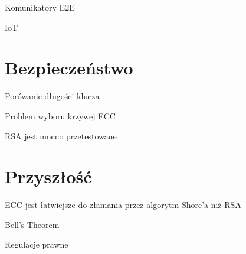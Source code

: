 \documentclass{beamer}
\begin{document}
\begin{frame}{Komunikatory E2E}
    
\end{frame}

\begin{frame}{IoT}
\end{frame}


\section{Bezpieczeństwo}

\begin{frame}{Porówanie długości klucza}
\end{frame}

\begin{frame}{Problem wyboru krzywej ECC}
\end{frame}


\begin{frame}{RSA jest mocno przetestowane}
\end{frame}

\section{Przyszłość}
\begin{frame}{ECC jest łatwiejsze do złamania przez algorytm Shore'a niż RSA}
    
\end{frame}
\begin{frame}{Bell's Theorem} %
    
\end{frame}

\begin{frame}{Regulacje prawne}
    
\end{frame}
\end{document}
